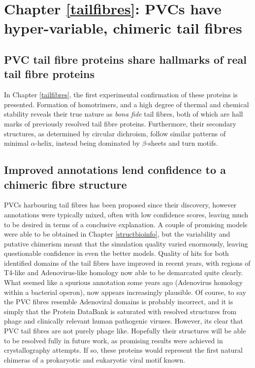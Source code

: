 \section{Chapter \ref{tailfibres}: PVCs have hyper-variable, chimeric tail fibres}
\subsection{PVC tail fibre proteins share hallmarks of real tail fibre proteins}
In Chapter \ref{tailfibres}, the first experimental confirmation of these proteins is presented. Formation of homotrimers, and a high degree of thermal and chemical stability reveals their true nature as \emph{bona fide} tail fibres, both of which are hall marks of previously resolved tail fibre proteins. Furthermore, their secondary structures, as determined by circular dichroism, follow similar patterns of minimal $\alpha$-helix, instead being dominated by $\beta$-sheets and turn motifs.

\subsection{Improved annotations lend confidence to a chimeric fibre structure}
PVCs harbouring tail fibres has been proposed since their discovery, however annotations were typically mixed, often with low confidence scores, leaving much to be desired in terms of a conclusive explanation. A couple of promising models were able to be obtained in Chapter \ref{structbioinfo}, but the variability and putative chimerism meant that the simulation quality varied enormously, leaving questionable confidence in even the better models. Quality of hits for both identified domains of the tail fibres have improved in recent years, with regions of T4-like and Adenovirus-like homology now able to be demarcated quite clearly. What seemed like a spurious annotation some years ago (Adenovirus homology within a bacterial operon), now appears increasingly plausible. Of course, to say the PVC fibres resemble Adenoviral domains is probably incorrect, and it is simply that the Protein DataBank is saturated with resolved structures from phage and clinically relevant human pathogenic viruses. However, its clear that PVC tail fibres are not purely phage like. Hopefully their structures will be able to be resolved fully in future work, as promising results were achieved in crystallography attempts. If so, these proteins would represent the first natural chimeras of a prokaryotic and eukaryotic viral motif known.

